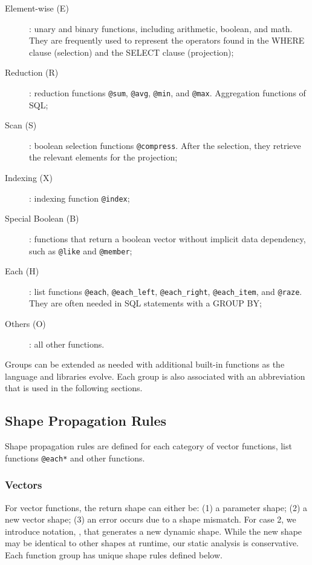 \begin{description}
\item[Element-wise (E)]:
    unary and binary functions, including arithmetic, boolean, and math. They are frequently used to represent the operators found in the WHERE clause (selection) and the SELECT clause (projection);

\item[Reduction (R)]:
    reduction functions \texttt{@sum}, \texttt{@avg}, \texttt{@min}, and \texttt{@max}. Aggregation functions of SQL;

\item[Scan (S)]:
    boolean selection functions \texttt{@compress}. After the selection, they retrieve the relevant elements for the projection;

\item[Indexing (X)]:
    indexing function \texttt{@index};

\item[Special Boolean (B)]:
    functions that return a boolean vector without implicit data dependency, such as
    \texttt{@like} and \texttt{@member};

\item[Each (H)]:
    list functions \texttt{@each}, \texttt{@each_left}, \texttt{@each_right},
    \texttt{@each_item}, and \texttt{@raze}. They are often needed in SQL statements with a GROUP BY;

\item[Others (O)]:
    all other functions.
\end{description}
Groups can be extended as needed with additional built-in functions as
the language and libraries evolve. Each group is also associated with
an abbreviation that is used in the following sections.

\subsection{Shape Propagation Rules} \label{SubSec:propagation}

Shape propagation rules are defined for each category of vector functions,
list functions \texttt{@each*} and other functions.

\subsubsection{Vectors}

For vector functions, the return shape can either be:
(1) a parameter shape;
(2) a new vector shape;
(3) an error occurs due to a shape mismatch.
For case 2, we introduce notation, \shapeN{}, that generates a new dynamic shape.
While the new shape may be identical to other shapes at runtime, our static
analysis is conservative. Each function group has unique shape rules defined below.

